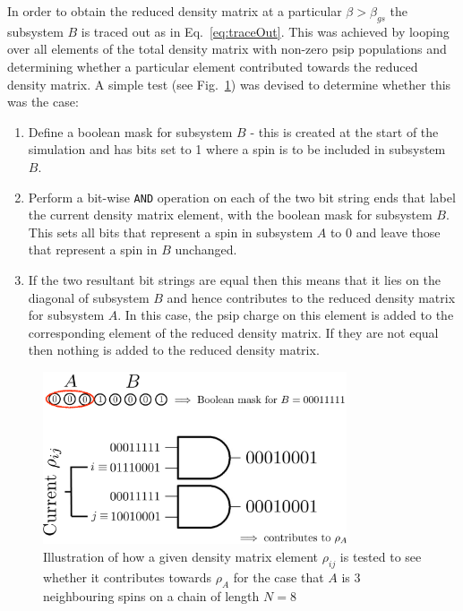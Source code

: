 In order to obtain the reduced density matrix at a particular $\beta > \beta_{gs}$ the subsystem $B$ is traced out as in Eq.~\ref{eq:traceOut}. This was achieved by looping over all elements of the total density matrix with non-zero psip populations and determining whether a particular element contributed towards the reduced density matrix. A simple test (see Fig.~\ref{fig:rdm_algorithm}) was devised to determine whether this was the case:

\begin{enumerate}
\item Define a boolean mask for subsystem $B$ - this is created at the start of the simulation and has bits set to 1 where a spin is to be included in subsystem $B$.
\item Perform a bit-wise \texttt{AND} operation on each of the two bit string ends that label the current density matrix element, with the boolean mask for subsystem $B$. This sets all bits that represent a spin in subsystem $A$ to 0 and leave those that represent a spin in $B$ unchanged.
\item If the two resultant bit strings are equal then this means that it lies on the diagonal of subsystem $B$ and hence contributes to the reduced density matrix for subsystem $A$. In this case, the psip charge on this element is added to the corresponding element of the reduced density matrix. If they are not equal then nothing is added to the reduced density matrix.
\end{enumerate}

\begin{figure}[H]
\begin{center}
\includegraphics[width =0.8\textwidth]{rdm_algorithm.pdf}
\caption{Illustration of how a given density matrix element $\rho_{ij}$ is tested to see whether it contributes towards $\rho_A$ for the case that $A$ is 3 neighbouring spins on a chain of length $N=8$}
\label{fig:rdm_algorithm}
\end{center}
\end{figure}

